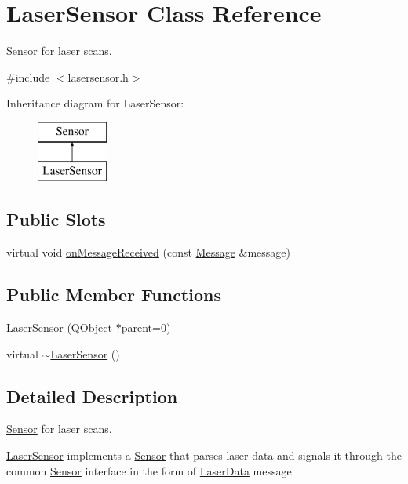 \hypertarget{classLaserSensor}{
\section{LaserSensor Class Reference}
\label{classLaserSensor}
}


\hyperlink{classSensor}{Sensor} for laser scans.  




{\ttfamily \#include $<$lasersensor.h$>$}

Inheritance diagram for LaserSensor:\begin{figure}[H]
\begin{center}
\leavevmode
\includegraphics[height=2.000000cm]{classLaserSensor}
\end{center}
\end{figure}
\subsection*{Public Slots}
\begin{DoxyCompactItemize}
\item 
virtual void \hyperlink{classLaserSensor_aa7b966f0849ce5c43920480abcae50f0}{onMessageReceived} (const \hyperlink{classMessage}{Message} \&message)
\end{DoxyCompactItemize}
\subsection*{Public Member Functions}
\begin{DoxyCompactItemize}
\item 
\hyperlink{classLaserSensor_a342c1557c4dbfa0401efa0c50dc0c6fb}{LaserSensor} (QObject $\ast$parent=0)
\item 
virtual \hyperlink{classLaserSensor_a3a1c45b4a6206163c713dbeec1d5d735}{$\sim$LaserSensor} ()
\end{DoxyCompactItemize}


\subsection{Detailed Description}
\hyperlink{classSensor}{Sensor} for laser scans. 

\hyperlink{classLaserSensor}{LaserSensor} implements a \hyperlink{classSensor}{Sensor} that parses laser data and signals it through the common \hyperlink{classSensor}{Sensor} interface in the form of \hyperlink{classLaserData}{LaserData} message

